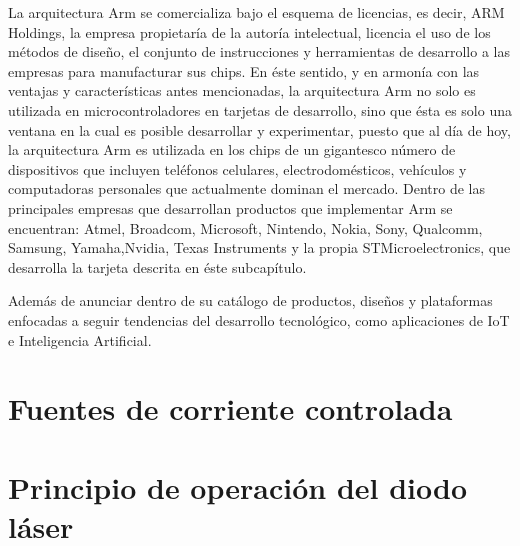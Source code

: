 La arquitectura Arm se comercializa bajo el esquema de licencias, es decir, ARM Holdings, la empresa propietaría de la autoría intelectual, licencia el uso de los métodos de diseño, el conjunto de instrucciones y herramientas de desarrollo a las empresas para manufacturar sus chips. En éste sentido, y en armonía con las ventajas y características antes mencionadas, la arquitectura Arm no solo es utilizada en microcontroladores en tarjetas de desarrollo, sino que ésta es solo una ventana en la cual es posible desarrollar y experimentar, puesto que al día de hoy, la arquitectura Arm es utilizada en los chips de un gigantesco número de dispositivos que incluyen teléfonos celulares, electrodomésticos, vehículos y computadoras personales que actualmente dominan el mercado\cite{armpage}. Dentro de las principales empresas que desarrollan productos que implementar Arm se encuentran:
Atmel, Broadcom, Microsoft, Nintendo, Nokia, Sony, Qualcomm, Samsung, Yamaha,Nvidia, Texas Instruments y la propia STMicroelectronics, que desarrolla la tarjeta  descrita en éste subcapítulo.

Además de anunciar dentro de su catálogo de productos, diseños y plataformas enfocadas a seguir tendencias del desarrollo tecnológico, como aplicaciones de IoT e Inteligencia Artificial. 





\section{Fuentes de corriente controlada}



\section{Principio de operación del diodo láser}
